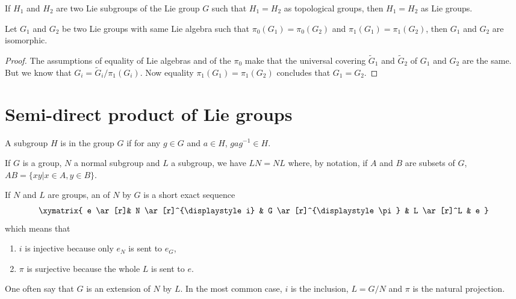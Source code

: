 \begin{corollary} \label{CORooMCWWooXkpkNO}
	If $H_1$ and $H_2$ are two Lie subgroups of the Lie group $G$  such that $H_1=H_2$ as topological groups, then $H_1=H_2$ as Lie groups.
\end{corollary}

\begin{proposition}
	Let $G_1$ and $G_2$ be two Lie groups with same Lie algebra such that $\pi_0(G_1)=\pi_0(G_2)$ and $\pi_1(G_1)=\pi_1(G_2)$, then $G_1$ and $G_2$ are isomorphic.
\end{proposition}

\begin{proof}
	The assumptions of equality of Lie algebras and of the $\pi_0$ make that the universal covering $\tilde G_1$ and $\tilde G_2$ of $G_1$ and $G_2$ are the same. But we know that $G_i=\tilde G_i/\pi_1(G_i)$. Now equality $\pi_1(G_1)=\pi_1(G_2)$ concludes that $G_1=G_2$.
\end{proof}

\section{Semi-direct product of Lie groups}

\begin{definition}
	A subgroup $H$ is  in the group $G$ if for any $g\in G$ and $a\in H$, $gag^{-1}\in H$.
\end{definition}

If $G$ is a group, $N$ a normal subgroup and $L$ a subgroup, we have $LN=NL$ where, by notation, if $A$ and $B$ are subsets of $G$, $AB=\{xy|x\in A,y\in B\}$.

If $N$ and $L$ are groups, an  of $N$ by $G$ is a short exact sequence
\begin{equation}
	\xymatrix{ e \ar[r]& N \ar[r]^{\displaystyle i} & G \ar[r]^{\displaystyle \pi} & L \ar[r]^L  & e }
\end{equation}
which means that

\begin{enumerate}
	\item $i$ is injective because only $e_N$ is sent to $e_G$,
	\item $\pi$ is surjective because the whole $L$ is sent to $e$.
\end{enumerate}
One often say that $G$ is an extension of $N$ by $L$. In the most common case, $i$ is the inclusion, $L=G/N$ and $\pi$ is the natural projection.

